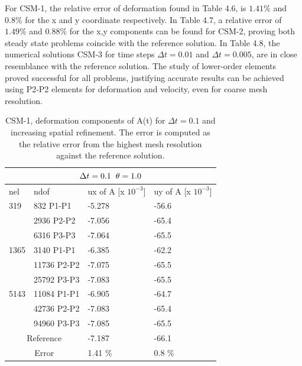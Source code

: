  For CSM-1, the relative error of deformation found in Table 4.6, is $1.41 \%$ and $0.8\%$ for the x and y coordinate respectively. In Table 4.7, a relative error of   $1.49 \%$ and $0.88\%$ for the x,y components can be found for CSM-2, proving both steady state problems coincide with the reference solution. In Table 4.8, the numerical solutions CSM-3 for time steps $\Delta t = 0.01$ and $\Delta t = 0.005$, are in close resemblance with the reference solution. The study of lower-order elements proved successful for all problems, justifying accurate results can be achieved using P2-P2 elements for deformation and velocity, even for coarse mesh resolution. 

\begin{table}[h!]
\centering
\begin{tabular}{ |p{1cm}||p{2.7cm}|p{3.3cm}|p{3.3cm}|}
\hline
  \multicolumn{4}{|c|}{$\Delta t = 0.1 \hspace{2mm} \theta = 1.0$} \\
\hline
nel & ndof & ux of A [x $10^{-3}$]  &uy of A [x $10^{-3}$] \\
\hline
 319     & 832 P1-P1  & -5.278 &  -56.6 \\
     & 2936 P2-P2 & -7.056 &  -65.4 \\
      & 6316 P3-P3 &  -7.064 &   -65.5  \\
 \hline
  1365    & 3140 P1-P1  & -6.385 &  -62.2 \\
     & 11736 P2-P2 & -7.075 &  -65.5 \\
     & 25792 P3-P3 & -7.083 &  -65.5 \\
 \hline
  5143    & 11084 P1-P1 & -6.905 &  -64.7  \\
     & 42736 P2-P2 & -7.083 &  -65.4\\
     & 94960 P3-P3 & -7.085 &  -65.5  \\
  \hline
  \multicolumn{2}{|c|}{Reference}  &-7.187    & -66.1 \\
   \hline
    \multicolumn{2}{|c|}{Error}  & 1.41 \%   & 0.8 \%\\
   \hline
\end{tabular}
\caption{CSM-1, deformation components of A(t) for $\Delta t = 0.1$ and increasing spatial refinement. The error is computed as the relative error from the highest mesh resolution against the reference solution.}
\label{table:csm1}
\end{table}

